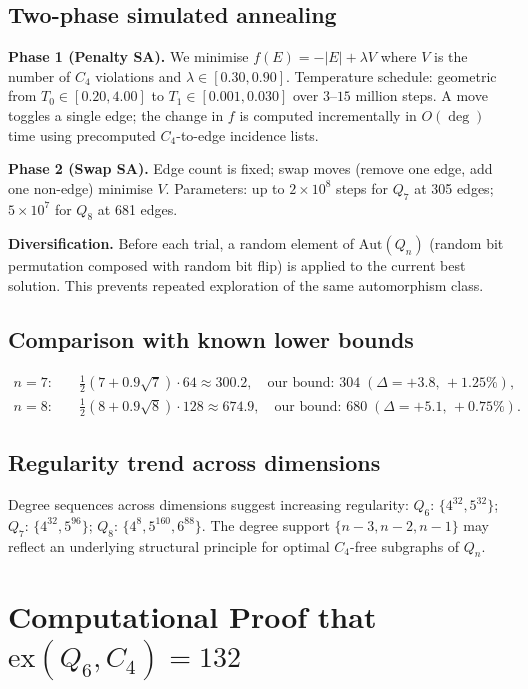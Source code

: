\documentclass[12pt,a4paper]{article}
\theoremstyle{definition}
\newcommand{\ex}{\mathrm{ex}}
\begin{document}
\subsection{Two-phase simulated annealing}

\noindent\textbf{Phase 1 (Penalty SA).}
We minimise $f(E)=-|E|+\lambda V$ where $V$ is the number of $C_4$ violations
and $\lambda\in[0.30,0.90]$.
Temperature schedule: geometric from $T_0\in[0.20,4.00]$ to
$T_1\in[0.001,0.030]$ over $3$--$15$ million steps.
A move toggles a single edge; the change in $f$ is computed incrementally
in $O(\deg)$ time using precomputed $C_4$-to-edge incidence lists.

\noindent\textbf{Phase 2 (Swap SA).}
Edge count is fixed; swap moves (remove one edge, add one non-edge)
minimise $V$.
Parameters: up to $2\times10^8$ steps for $Q_7$ at 305 edges;
$5\times10^7$ for $Q_8$ at 681 edges.

\noindent\textbf{Diversification.}
Before each trial, a random element of $\mathrm{Aut}(Q_n)$
(random bit permutation composed with random bit flip) is applied to
the current best solution.  This prevents repeated exploration of the
same automorphism class.

\subsection{Comparison with known lower bounds}

\begin{align*}
n=7:&\quad\tfrac12(7+0.9\sqrt7)\cdot64\approx300.2,\quad\text{our bound: }304\;(\Delta=+3.8,\,+1.25\%),\\
n=8:&\quad\tfrac12(8+0.9\sqrt8)\cdot128\approx674.9,\quad\text{our bound: }680\;(\Delta=+5.1,\,+0.75\%).
\end{align*}

\subsection{Regularity trend across dimensions}

Degree sequences across dimensions suggest increasing regularity:
$Q_6$: $\{4^{32},5^{32}\}$;
$Q_7$: $\{4^{32},5^{96}\}$;
$Q_8$: $\{4^8,5^{160},6^{88}\}$.
The degree support $\{n-3,n-2,n-1\}$ may reflect an underlying structural
principle for optimal $C_4$-free subgraphs of $Q_n$.

\section{Computational Proof that $\ex(Q_6,C_4)=132$}\label{sec:q6}
\end{document}
